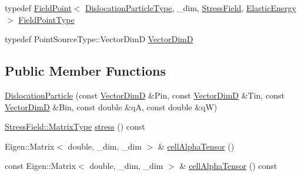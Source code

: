 \begin{DoxyCompactItemize}
\item 
typedef \hyperlink{structmodel_1_1_field_point}{Field\+Point}$<$ \hyperlink{structmodel_1_1_dislocation_particle_a707bb7bef0eeac9a9281626d2b30fdc6}{Dislocation\+Particle\+Type}, \+\_\+dim, \hyperlink{structmodel_1_1_dislocation_particle_a11c4d91265aef10567dc83b869e06fd5}{Stress\+Field}, \hyperlink{structmodel_1_1_dislocation_particle_acb452e4510d2079aa300effcf6829e6f}{Elastic\+Energy} $>$ \hyperlink{structmodel_1_1_dislocation_particle_a89a31e2be848e9b3d236eaf3334ffe49}{Field\+Point\+Type}
\item 
typedef Point\+Source\+Type\+::\+Vector\+Dim\+D \hyperlink{structmodel_1_1_dislocation_particle_ac31483dc9c0a9aef3dde10fa00583b39}{Vector\+Dim\+D}
\end{DoxyCompactItemize}
\subsection*{Public Member Functions}
\begin{DoxyCompactItemize}
\item 
\hyperlink{structmodel_1_1_dislocation_particle_a7bda5f6949e68877ec1825dad5543d90}{Dislocation\+Particle} (const \hyperlink{structmodel_1_1_dislocation_particle_ac31483dc9c0a9aef3dde10fa00583b39}{Vector\+Dim\+D} \&Pin, const \hyperlink{structmodel_1_1_dislocation_particle_ac31483dc9c0a9aef3dde10fa00583b39}{Vector\+Dim\+D} \&Tin, const \hyperlink{structmodel_1_1_dislocation_particle_ac31483dc9c0a9aef3dde10fa00583b39}{Vector\+Dim\+D} \&Bin, const double \&q\+A, const double \&q\+W)
\item 
\hyperlink{structmodel_1_1_dislocation_stress_a58cfb5429639657d58da42d9c3854505}{Stress\+Field\+::\+Matrix\+Type} \hyperlink{structmodel_1_1_dislocation_particle_a5f0c9d9e7bb1674ec607f55c2bd1df8d}{stress} () const 
\item 
Eigen\+::\+Matrix$<$ double, \+\_\+dim, \+\_\+dim $>$ \& \hyperlink{structmodel_1_1_dislocation_particle_aa33b23cfd4fa2b8d55bb308e61a6cc83}{cell\+Alpha\+Tensor} ()
\item 
const Eigen\+::\+Matrix$<$ double, \+\_\+dim, \+\_\+dim $>$ \& \hyperlink{structmodel_1_1_dislocation_particle_a9e49571d98ce752d314520926dea5fa8}{cell\+Alpha\+Tensor} () const 
\end{DoxyCompactItemize}
